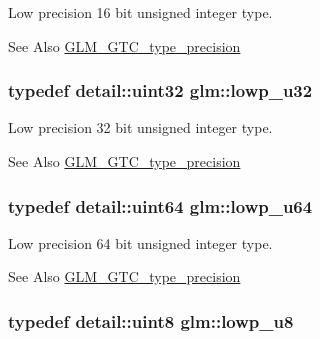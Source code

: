 Low precision 16 bit unsigned integer type. \begin{DoxySeeAlso}{See Also}
\hyperlink{group__gtc__type__precision}{G\-L\-M\-\_\-\-G\-T\-C\-\_\-type\-\_\-precision} 
\end{DoxySeeAlso}
\hypertarget{group__gtc__type__precision_gaba06fae1dd98ca50c017e68345df0365}{
\subsubsection[{lowp\-\_\-u32}]{\setlength{\rightskip}{0pt plus 5cm}typedef detail\-::uint32 {\bf glm\-::lowp\-\_\-u32}}}\label{group__gtc__type__precision_gaba06fae1dd98ca50c017e68345df0365}
Low precision 32 bit unsigned integer type. \begin{DoxySeeAlso}{See Also}
\hyperlink{group__gtc__type__precision}{G\-L\-M\-\_\-\-G\-T\-C\-\_\-type\-\_\-precision} 
\end{DoxySeeAlso}
\hypertarget{group__gtc__type__precision_ga61ed4c68a4cffb77cd63cc107119123a}{
\subsubsection[{lowp\-\_\-u64}]{\setlength{\rightskip}{0pt plus 5cm}typedef detail\-::uint64 {\bf glm\-::lowp\-\_\-u64}}}\label{group__gtc__type__precision_ga61ed4c68a4cffb77cd63cc107119123a}
Low precision 64 bit unsigned integer type. \begin{DoxySeeAlso}{See Also}
\hyperlink{group__gtc__type__precision}{G\-L\-M\-\_\-\-G\-T\-C\-\_\-type\-\_\-precision} 
\end{DoxySeeAlso}
\hypertarget{group__gtc__type__precision_gae63f942c49a30dbf266b2f13f3efe257}{
\subsubsection[{lowp\-\_\-u8}]{\setlength{\rightskip}{0pt plus 5cm}typedef detail\-::uint8 {\bf glm\-::lowp\-\_\-u8}}}\label{group__gtc__type__precision_gae63f942c49a30dbf266b2f13f3efe257}
